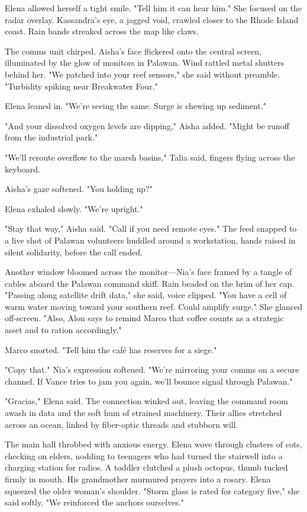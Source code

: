 Elena allowed herself a tight smile. "Tell him it can hear him." She focused on the radar overlay. Kassandra's eye, a jagged void, crawled closer to the Rhode Island coast. Rain bands streaked across the map like claws.

The comms unit chirped. Aisha's face flickered onto the central screen, illuminated by the glow of monitors in Palawan. Wind rattled metal shutters behind her. "We patched into your reef sensors," she said without preamble. "Turbidity spiking near Breakwater Four."

Elena leaned in. "We're seeing the same. Surge is chewing up sediment."

"And your dissolved oxygen levels are dipping," Aisha added. "Might be runoff from the industrial park."

"We'll reroute overflow to the marsh basins," Talia said, fingers flying across the keyboard.

Aisha's gaze softened. "You holding up?"

Elena exhaled slowly. "We're upright."

"Stay that way," Aisha said. "Call if you need remote eyes." The feed snapped to a live shot of Palawan volunteers huddled around a workstation, hands raised in silent solidarity, before the call ended.

Another window bloomed across the monitor—Nia's face framed by a tangle of cables aboard the Palawan command skiff. Rain beaded on the brim of her cap. "Passing along satellite drift data," she said, voice clipped. "You have a cell of warm water moving toward your southern reef. Could amplify surge." She glanced off-screen. "Also, Alon says to remind Marco that coffee counts as a strategic asset and to ration accordingly."

Marco snorted. "Tell him the café has reserves for a siege."

"Copy that." Nia's expression softened. "We're mirroring your comms on a secure channel. If Vance tries to jam you again, we'll bounce signal through Palawan."

"Gracias," Elena said. The connection winked out, leaving the command room awash in data and the soft hum of strained machinery. Their allies stretched across an ocean, linked by fiber-optic threads and stubborn will.

\bigskip

The main hall throbbed with anxious energy. Elena wove through clusters of cots, checking on elders, nodding to teenagers who had turned the stairwell into a charging station for radios. A toddler clutched a plush octopus, thumb tucked firmly in mouth. His grandmother murmured prayers into a rosary. Elena squeezed the older woman's shoulder. "Storm glass is rated for category five," she said softly. "We reinforced the anchors ourselves."

